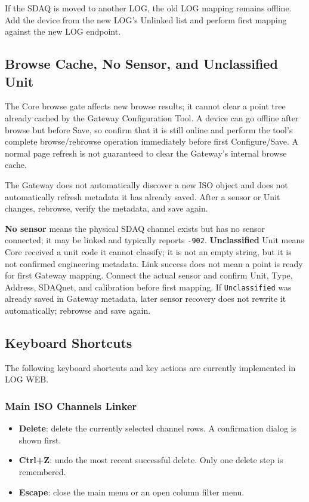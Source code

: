 \documentclass[11pt,a4paper]{article}
\begin{document}
If the SDAQ is moved to another LOG, the old LOG mapping remains offline. Add the device from the new LOG's Unlinked list and perform first mapping against the new LOG endpoint.

\subsection{Browse Cache, No Sensor, and Unclassified Unit}
The Core browse gate affects new browse results; it cannot clear a point tree already cached by the Gateway Configuration Tool. A device can go offline after browse but before Save, so confirm that it is still online and perform the tool's complete browse/rebrowse operation immediately before first Configure/Save. A normal page refresh is not guaranteed to clear the Gateway's internal browse cache.

The Gateway does not automatically discover a new ISO object and does not automatically refresh metadata it has already saved. After a sensor or Unit changes, rebrowse, verify the metadata, and save again.

\textbf{No sensor} means the physical SDAQ channel exists but has no sensor connected; it may be linked and typically reports \texttt{-902}. \textbf{Unclassified} Unit means Core received a unit code it cannot classify; it is not an empty string, but it is not confirmed engineering metadata. Link success does not mean a point is ready for first Gateway mapping. Connect the actual sensor and confirm Unit, Type, Address, SDAQnet, and calibration before first mapping. If \texttt{Unclassified} was already saved in Gateway metadata, later sensor recovery does not rewrite it automatically; rebrowse and save again.

\subsection{Keyboard Shortcuts}
The following keyboard shortcuts and key actions are currently implemented in LOG WEB.

\subsubsection{Main ISO Channels Linker}
\begin{itemize}
\item \textbf{Delete}: delete the currently selected channel rows. A confirmation dialog is shown first.
\item \textbf{Ctrl+Z}: undo the most recent successful delete. Only one delete step is remembered.
\item \textbf{Escape}: close the main menu or an open column filter menu.
\end{itemize}
\end{document}
